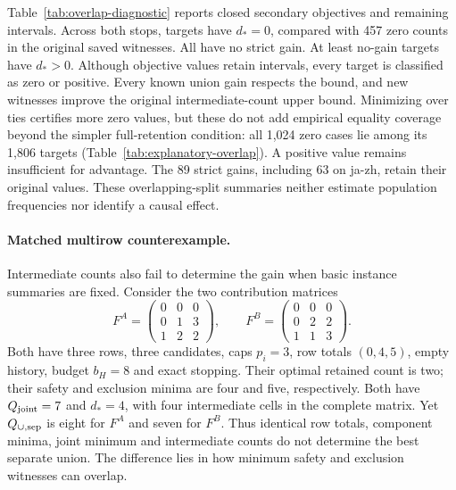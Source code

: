 Table~\ref{tab:overlap-diagnostic} reports \dStarClosed{} closed secondary objectives and \dStarUnclosed{} remaining intervals. Across both stops, \dStarZero{} targets have $d_*=0$, compared with 457 zero counts in the original saved witnesses. All have no strict gain. At least \dStarPositiveNoGain{} no-gain targets have $d_*>0$. Although \dStarUnclosed{} objective values retain intervals, every target is classified as zero or positive. Every known union gain respects the bound, and \dStarTighter{} new witnesses improve the original intermediate-count upper bound. Minimizing over ties certifies more zero values, but these do not add empirical equality coverage beyond the simpler full-retention condition: all 1,024 zero cases lie among its 1,806 targets (Table~\ref{tab:explanatory-overlap}). A positive value remains insufficient for advantage. The 89 strict gains, including 63 on ja-zh, retain their original values. These overlapping-split summaries neither estimate population frequencies nor identify a causal effect.


\paragraph{Matched multirow counterexample.}
Intermediate counts also fail to determine the gain when basic instance summaries are fixed. Consider the two contribution matrices
\[
 F^{A}=\begin{pmatrix}0&0&0\\0&1&3\\1&2&2\end{pmatrix},\qquad
 F^{B}=\begin{pmatrix}0&0&0\\0&2&2\\1&1&3\end{pmatrix}.
\]
Both have three rows, three candidates, caps $p_i=3$, row totals $(0,4,5)$, empty history, budget $b_H=8$ and exact stopping. Their optimal retained count is two; their safety and exclusion minima are four and five, respectively. Both have $Q_{\rm joint}=7$ and $d_*=4$, with four intermediate cells in the complete matrix. Yet $Q_{\cup,\rm sep}$ is eight for $F^A$ and seven for $F^B$. Thus identical row totals, component minima, joint minimum and intermediate counts do not determine the best separate union. The difference lies in how minimum safety and exclusion witnesses can overlap.

